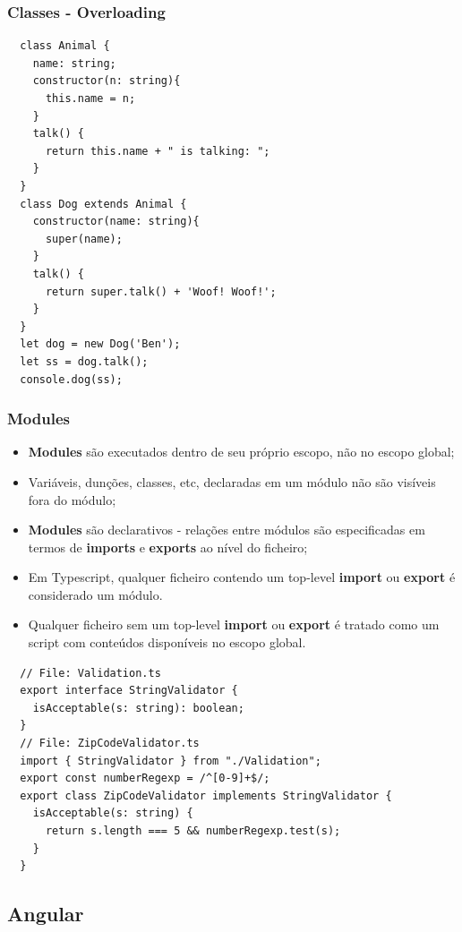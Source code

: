 \documentclass{article}
\begin{document}
\subsubsection{Classes - Overloading}

\begin{lstlisting}
  class Animal {
    name: string;
    constructor(n: string){
      this.name = n;
    }
    talk() {
      return this.name + " is talking: ";
    }
  }
  class Dog extends Animal {
    constructor(name: string){
      super(name);
    }
    talk() {
      return super.talk() + 'Woof! Woof!';
    }
  }
  let dog = new Dog('Ben');
  let ss = dog.talk();
  console.dog(ss);
\end{lstlisting}

\pagebreak

\subsubsection{Modules}

\begin{itemize}
\item \textbf{Modules} são executados dentro de seu próprio escopo, não no escopo global;
\item Variáveis, dunções, classes, etc, declaradas em um módulo não são visíveis fora do módulo;
\item \textbf{Modules} são declarativos - relações entre módulos são especificadas
em termos de \textbf{imports} e \textbf{exports} ao nível do ficheiro;
\item Em Typescript, qualquer ficheiro contendo um top-level \textbf{import} ou
\textbf{export} é considerado um módulo.
\item Qualquer ficheiro sem um top-level \textbf{import} ou \textbf{export}
é tratado como um script com conteúdos disponíveis no escopo global.
\end{itemize}

\begin{lstlisting}
  // File: Validation.ts
  export interface StringValidator {
    isAcceptable(s: string): boolean;
  }
  // File: ZipCodeValidator.ts
  import { StringValidator } from "./Validation";
  export const numberRegexp = /^[0-9]+$/;
  export class ZipCodeValidator implements StringValidator {
    isAcceptable(s: string) {
      return s.length === 5 && numberRegexp.test(s);
    }
  }
\end{lstlisting}

\subsection{Angular}
\end{document}
